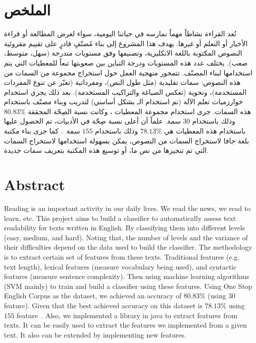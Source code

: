 

\section*{الملخص}
تُعد القراءة نشاطاً مهماً نمارسه في حياتنا اليومية،
سواء لغرض المطالعة أو قراءة الأخبار أو التعلم أو غيرها.
يهدف هذا المشروع إلى بناء مُصنّفٍ قادرٍ على تقييم مقروئية النصوص المكتوبة باللغة الانكليزية،
وتصنيفها وفق مستويات متدرجة (سهل، متوسط، صعب).
يختلف عدد هذه المستويات ودرجة التباين بين صعوبتها تبعاً للمعطيات التي يتم استخدامها لبناء المصنّف.
تتمحور منهجية العمل حول استخراج مجموعة من السمات من هذه النصوص:
سمات تقليدية (مثل طول النص)، ومفرداتية (تعبّر عن تنوع المفردات المستخدمة)، ونحوية (تعكس الصياغة والتراكيب المستخدمة).
بعد ذلك يجري استخدام خوارزميات تعلم الآلة (تم استخدام الـ  بشكل أساسي) لتدريب وبناء مصنّف باستخدام هذه السمات.
جرى استخدام مجموعة المعطيات ، وكانت نسبة الصِحّة المحققة $80.83\%$ وذلك باستخدام $30$ سمة.
علماً أن أعلى نسبة صِحّة في الأدبيات، تم الحصول عليها باستخدام هذه المعطيات هي $78.13\%$ وذلك باستخدام $155$ سمة~\cite{vajjala2018}.
كما جرى بناء مكتبة بلغة جافا لاستخراج السمات من النصوص،
يمكن بسهولة استخدامها لاستخراج السمات التي تم تنجيزها من نص ما، أو توسيع هذه المكتبة بتعريف سمات جديدة.


\vfill
{}
\section*{Abstract}

Reading is an important activity in our daily lives.
We read the news, we read to learn, etc.
This project aims to build a classifier to automatically assess text readability for texts written in English.
By classifying them into different levels (easy, medium, and hard).
Noting that, the number of levels and the variance of their difficulties depend on the data used to build the classifier.
The methodology is to extract certain set of features from these texts.
Traditional features (e.g. text length), lexical features (measure vocabulary being used),
and syntactic features (measure sentence complexity).
Then using machine learning algorithms (SVM mainly) to train and build a classifier using these features.
Using One Stop English Corpus as the dataset, we achieved an accuracy of $80.83\%$ (using $30$ feature).
Given that the best achieved accuracy on this dataset is $78.13\%$ using $155$ feature~\cite{vajjala2018}.
Also, we implemented a library in java to extract features from texts.
It can be easily used to extract the features we implemented from a given text.
It also can be extended by implementing new features.






